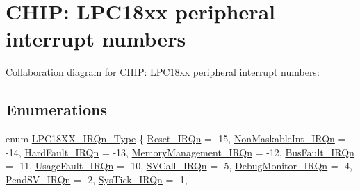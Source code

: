 \hypertarget{group___c_m_s_i_s__18_x_x___i_r_q}{}\section{C\+H\+IP\+: L\+P\+C18xx peripheral interrupt numbers}
\label{group___c_m_s_i_s__18_x_x___i_r_q}
Collaboration diagram for C\+H\+IP\+: L\+P\+C18xx peripheral interrupt numbers\+:
\subsection*{Enumerations}
\begin{DoxyCompactItemize}
\item 
enum \hyperlink{group___c_m_s_i_s__18_x_x___i_r_q_gaa44deabd252bda567898bae35a086adc}{L\+P\+C18\+X\+X\+\_\+\+I\+R\+Qn\+\_\+\+Type} \{ \newline
\hyperlink{group___c_m_s_i_s__18_x_x___i_r_q_ggaa44deabd252bda567898bae35a086adca50ad21f2fd0d54d04b390d5a9145889a}{Reset\+\_\+\+I\+R\+Qn} = -\/15, 
\hyperlink{group___c_m_s_i_s__18_x_x___i_r_q_ggaa44deabd252bda567898bae35a086adcade177d9c70c89e084093024b932a4e30}{Non\+Maskable\+Int\+\_\+\+I\+R\+Qn} = -\/14, 
\hyperlink{group___c_m_s_i_s__18_x_x___i_r_q_ggaa44deabd252bda567898bae35a086adcab1a222a34a32f0ef5ac65e714efc1f85}{Hard\+Fault\+\_\+\+I\+R\+Qn} = -\/13, 
\hyperlink{group___c_m_s_i_s__18_x_x___i_r_q_ggaa44deabd252bda567898bae35a086adca33ff1cf7098de65d61b6354fee6cd5aa}{Memory\+Management\+\_\+\+I\+R\+Qn} = -\/12, 
\newline
\hyperlink{group___c_m_s_i_s__18_x_x___i_r_q_ggaa44deabd252bda567898bae35a086adca8693500eff174f16119e96234fee73af}{Bus\+Fault\+\_\+\+I\+R\+Qn} = -\/11, 
\hyperlink{group___c_m_s_i_s__18_x_x___i_r_q_ggaa44deabd252bda567898bae35a086adca6895237c9443601ac832efa635dd8bbf}{Usage\+Fault\+\_\+\+I\+R\+Qn} = -\/10, 
\hyperlink{group___c_m_s_i_s__18_x_x___i_r_q_ggaa44deabd252bda567898bae35a086adca4ce820b3cc6cf3a796b41aadc0cf1237}{S\+V\+Call\+\_\+\+I\+R\+Qn} = -\/5, 
\hyperlink{group___c_m_s_i_s__18_x_x___i_r_q_ggaa44deabd252bda567898bae35a086adca8e033fcef7aed98a31c60a7de206722c}{Debug\+Monitor\+\_\+\+I\+R\+Qn} = -\/4, 
\newline
\hyperlink{group___c_m_s_i_s__18_x_x___i_r_q_ggaa44deabd252bda567898bae35a086adca03c3cc89984928816d81793fc7bce4a2}{Pend\+S\+V\+\_\+\+I\+R\+Qn} = -\/2, 
\hyperlink{group___c_m_s_i_s__18_x_x___i_r_q_ggaa44deabd252bda567898bae35a086adca6dbff8f8543325f3474cbae2446776e7}{Sys\+Tick\+\_\+\+I\+R\+Qn} = -\/1, 

\end{DoxyCompactItemize}
